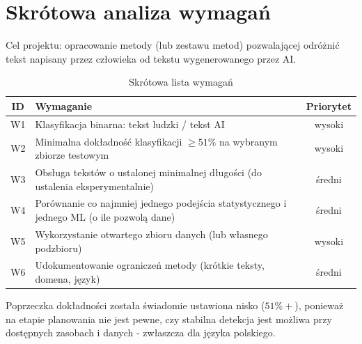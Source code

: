 \section{Skrótowa analiza wymagań}

Cel projektu: opracowanie metody (lub zestawu metod) pozwalającej odróżnić tekst napisany przez człowieka od tekstu wygenerowanego przez AI.

\begin{table}[H]
\centering
\begin{tabularx}{\textwidth}{|c|X|c|}
\hline
\textbf{ID} & \textbf{Wymaganie} & \textbf{Priorytet} \\
\hline
W1 & Klasyfikacja binarna: tekst ludzki / tekst AI & wysoki \\
\hline
W2 & Minimalna dokładność klasyfikacji $\geq 51\%$ na wybranym zbiorze testowym & wysoki \\
\hline
W3 & Obsługa tekstów o ustalonej minimalnej długości (do ustalenia eksperymentalnie) & średni \\
\hline
W4 & Porównanie co najmniej jednego podejścia statystycznego i jednego ML (o ile pozwolą dane) & średni \\
\hline
W5 & Wykorzystanie otwartego zbioru danych (lub własnego podzbioru) & wysoki \\
\hline
W6 & Udokumentowanie ograniczeń metody (krótkie teksty, domena, język) & średni \\
\hline
\end{tabularx}
\caption{Skrótowa lista wymagań}
\end{table}

Poprzeczka dokładności została świadomie ustawiona nisko ($51\%+$), ponieważ na etapie planowania nie jest pewne, czy stabilna detekcja jest możliwa przy dostępnych zasobach i danych - zwłaszcza dla języka polskiego.
